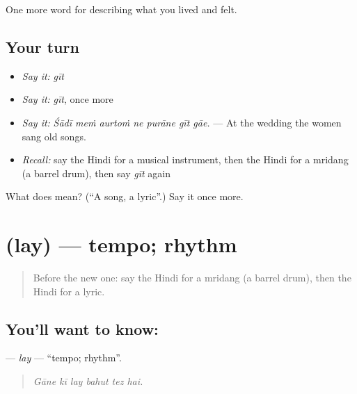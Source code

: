 \begin{grammarlens}[title={What you've built}]
One more word for describing what you lived and felt.
\end{grammarlens}

\subsection*{Your turn}
\begin{itemize}
\raggedright
  \item \emph{Say it:} \emph{gīt}
  \item \emph{Say it:} \emph{gīt}, once more
  \item \emph{Say it:} \emph{Śādī meṁ aurtoṁ ne purāne gīt gāe.} — At the wedding the women sang old songs.
  \item \emph{Recall:} say the Hindi for a musical instrument, then the Hindi for a mridang (a barrel drum), then say \emph{gīt} again
\end{itemize}

\begin{tcolorbox}[breakable,colback=teal!4,colframe=teal!35!black,title={Before you move on}]
What does  mean? (\textquotedblleft{}A song, a lyric\textquotedblright{}.) Say it once more.
\end{tcolorbox}
\section[\texorpdfstring{\hi{लय} (lay)}{लय (lay)}]{ (lay) — tempo; rhythm}

\label{lesson:HI-C532-lay}



\begin{quote}
Before the new one: say the Hindi for a mridang (a barrel drum), then the Hindi for a lyric.
\end{quote}

\subsection*{You'll want to know: }
\textbf{} — \emph{lay} — \textquotedblleft{}tempo; rhythm\textquotedblright{}.

\begin{quote}
     
\end{quote}

\begin{quote}
\emph{Gāne kī lay bahut tez hai.}
\end{quote}

